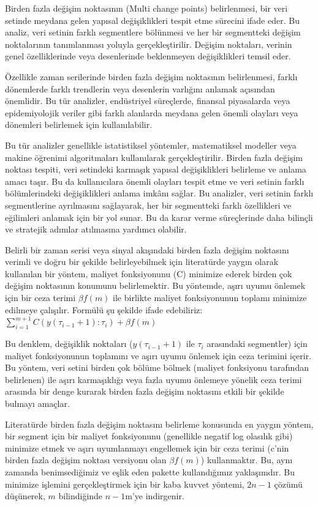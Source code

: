 \documentclass[12pt,twoside]{deuthesis}
\begin{document}
Birden fazla değişim noktasının (Multi change points) belirlenmesi, bir veri setinde meydana gelen yapısal değişiklikleri tespit etme sürecini ifade eder. Bu analiz, veri setinin farklı segmentlere bölünmesi ve her bir segmentteki değişim noktalarının tanımlanması yoluyla gerçekleştirilir. Değişim noktaları, verinin genel özelliklerinde veya desenlerinde beklenmeyen değişiklikleri temsil eder.

Özellikle zaman serilerinde birden fazla değişim noktasının belirlenmesi, farklı dönemlerde farklı trendlerin veya desenlerin varlığını anlamak açısından önemlidir. Bu tür analizler, endüstriyel süreçlerde, finansal piyasalarda veya epidemiyolojik veriler gibi farklı alanlarda meydana gelen önemli olayları veya dönemleri belirlemek için kullanılabilir.

Bu tür analizler genellikle istatistiksel yöntemler, matematiksel modeller veya makine öğrenimi algoritmaları kullanılarak gerçekleştirilir. Birden fazla değişim noktası tespiti, veri setindeki karmaşık yapısal değişiklikleri belirleme ve anlama amacı taşır. Bu da kullanıcılara önemli olayları tespit etme ve veri setinin farklı bölümlerindeki değişiklikleri anlama imkânı sağlar. Bu analizler, veri setinin farklı segmentlerine ayrılmasını sağlayarak, her bir segmentteki farklı özellikleri ve eğilimleri anlamak için bir yol sunar. Bu da karar verme süreçlerinde daha bilinçli ve stratejik adımlar atılmasına yardımcı olabilir.

Belirli bir zaman serisi veya sinyal akışındaki birden fazla değişim noktasını verimli ve doğru bir şekilde belirleyebilmek için literatürde yaygın olarak kullanılan bir yöntem, maliyet fonksiyonunu (C) minimize ederek birden çok değişim noktasının konumunu belirlemektir. Bu yöntemde, aşırı uyumu önlemek için bir ceza terimi \(\beta f(m)\) ile birlikte maliyet fonksiyonunun toplamı minimize edilmeye çalışılır. Formülü şu şekilde ifade edebiliriz: \(\sum_{i=1}^{m+1} C(y(\tau_{i-1}+1):\tau_i) + \beta f(m)\)

Bu denklem, değişiklik noktaları (\(y(\tau_{i-1}+1)\) ile \(\tau_i\) arasındaki segmentler) için maliyet fonksiyonunun toplamını ve aşırı uyumu önlemek için ceza terimini içerir. Bu yöntem, veri setini birden çok bölüme bölmek (maliyet fonksiyonu tarafından belirlenen) ile aşırı karmaşıklığı veya fazla uyumu önlemeye yönelik ceza terimi arasında bir denge kurarak birden fazla değişim noktasını etkili bir şekilde bulmayı amaçlar.

Literatürde birden fazla değişim noktasını belirleme konusunda en yaygın yöntem, bir segment için bir maliyet fonksiyonunu (genellikle negatif log olasılık gibi) minimize etmek ve aşırı uyumlanmayı engellemek için bir ceza terimi (c'nin birden fazla değişim noktası versiyonu olan \(\beta f(m)\)) kullanmaktır. Bu, aynı zamanda benimsediğimiz ve eşlik eden pakette kullandığımız yaklaşımdır. Bu minimize işlemini gerçekleştirmek için bir kaba kuvvet yöntemi, \(2n-1\) çözümü düşünerek, \(m\) bilindiğinde \(n-1\)m'ye indirgenir.
\end{document}
